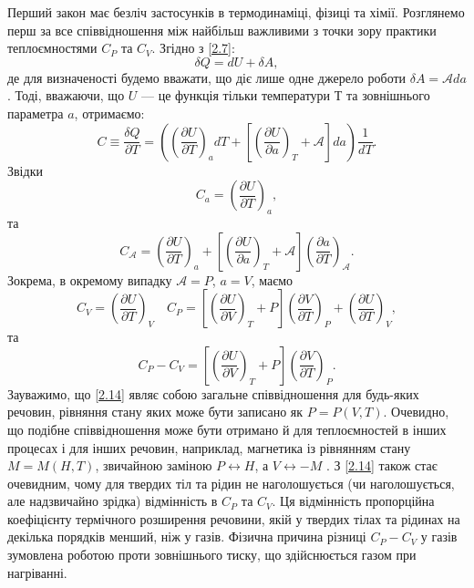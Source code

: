 Перший закон має безліч застосунків в термодинаміці, фізиці та хімії. Розглянемо перш за все
співвідношення між найбільш важливими з точки зору практики теплоємностями $C_P$ та $C_V$. Згідно
з \eqref{2.7}:
\begin{equation}\label{2.9}
	\delta Q = dU + \delta A,
\end{equation}
де для визначеності будемо вважати, що діє лише одне джерело роботи $\delta A = \mathcal{A} da$.
Тоді, вважаючи, що $U$ --- це функція тільки температури $Т$ та зовнішнього параметра $a$, отримаємо:
\begin{equation}\label{2.10}
	C \equiv \dfrac{\delta Q}{\partial T} = \left(\left(\dfrac{\partial U}{\partial T}\right)_{a}dT +
	\left[\left(\dfrac{\partial U}{\partial a}\right)_{T} + \mathcal{A} \right]da\right)\dfrac{1}{dT}.
\end{equation}
Звідки
\begin{equation}\label{2.11}
	C_{a} = \left(\dfrac{\partial U}{\partial T}\right)_a,
\end{equation}
та
\begin{equation}\label{2.12}
	C_{\mathcal{A}} = \left(\dfrac{\partial U}{\partial T}\right)_{a} + \left[\left(\dfrac{\partial
			U}{\partial a}\right)_{T} +\mathcal{A}\right]\left(\dfrac{\partial a}{\partial
		T}\right)_{\mathcal{A}}.
\end{equation}
Зокрема, в окремому випадку $\mathcal{A}=P$, $a=V$, маємо
\begin{equation}\label{2.13}
	C_V = \left(\dfrac{\partial U}{\partial T}\right)_{V}\quad C_P = \left[\left(\dfrac{\partial
			U}{\partial V}\right)_{T}+P\right]\left(\dfrac{\partial V}{\partial T}\right)_{P} +
	\left(\dfrac{\partial U}{\partial T}\right)_{V},
\end{equation}
та
\begin{equation}\label{2.14}
	C_P - C_V = \left[\left(\dfrac{\partial U}{\partial V}\right)_{T}+P\right]\left(\dfrac{\partial
V}{\partial T}\right)_{P}.
\end{equation}
Зауважимо, що \eqref{2.14} являє собою загальне співвідношення для будь-яких речовин, рівняння
стану
яких може бути записано як $P = P(V,T)$. Очевидно, що подібне співвідношення може бути отримано й для
теплоємностей в інших процесах і для інших речовин, наприклад, магнетика із рівнянням стану $M =
	M(H,T)$, звичайною заміною $P\leftrightarrow H$, а $V\leftrightarrow -M$ . З \eqref{2.14}
також стає
очевидним, чому для твердих тіл та рідин не наголошується (чи наголошується, але надзвичайно зрідка)
відмінність в $C_P$ та $C_V$. Ця відмінність пропорційна коефіцієнту термічного розширення речовини,
якій у твердих тілах та рідинах на декілька порядків менший, ніж у газів. Фізична причина різниці
$C_P-C_V$ у газів зумовлена роботою проти зовнішнього тиску, що здійснюється газом при нагріванні.

